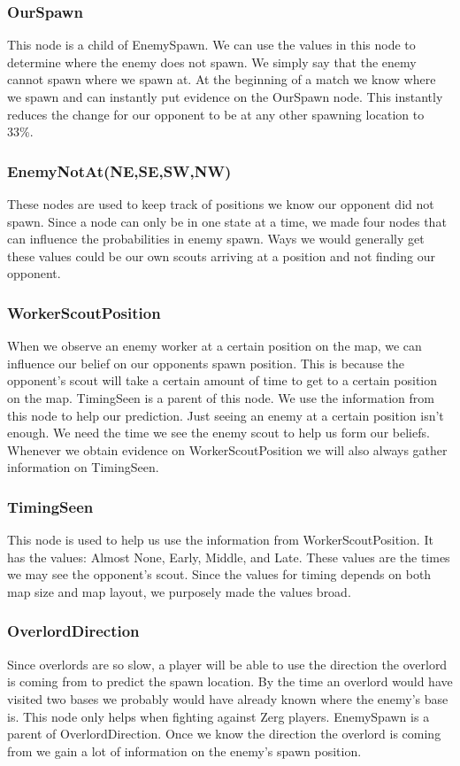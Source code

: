 \subsubsection*{OurSpawn}
This node is a child of EnemySpawn. We can use the values in this node to determine where the enemy does not spawn. We simply say that the enemy cannot spawn where we spawn at. At the beginning of a match we know where we spawn and can instantly put evidence on the OurSpawn node. This instantly reduces the change for our opponent to be at any other spawning location to 33\%.

\subsubsection*{EnemyNotAt(NE,SE,SW,NW)}
These nodes are used to keep track of positions we know our opponent did not spawn. Since a node can only be in one state at a time, we made four nodes that can influence the probabilities in enemy spawn. Ways we would generally get these values could be our own scouts arriving at a position and not finding our opponent.

\subsubsection*{WorkerScoutPosition} When we observe an enemy worker at a certain position on the map, we can influence our belief on our opponents spawn position. This is because the opponent's scout will take a certain amount of time to get to a certain position on the map. TimingSeen is a parent of this node. We use the information from this node to help our prediction. Just seeing an enemy at a certain position isn't enough. We need the time we see the enemy scout to help us form our beliefs. Whenever we obtain evidence on WorkerScoutPosition we will also always gather information on TimingSeen.

\subsubsection*{TimingSeen} This node is used to help us use the information from WorkerScoutPosition. It has the values: Almost None, Early, Middle, and Late. These values are the times we may see the opponent's scout. Since the values for timing depends on both map size and map layout, we purposely made the values broad.


\subsubsection*{OverlordDirection} Since overlords are so slow, a player will be able to use the direction the overlord is coming from to predict the spawn location. By the time an overlord would have visited two bases we probably would have already known where the enemy's base is. This node only helps when fighting against Zerg players. EnemySpawn is a parent of OverlordDirection. Once we know the direction the overlord is coming from we gain a lot of information on the enemy's spawn position.

